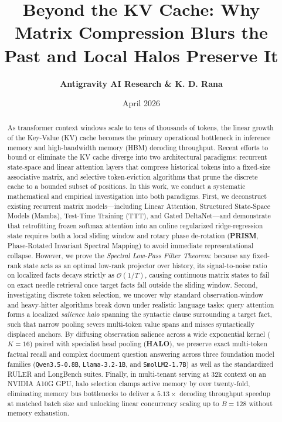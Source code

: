 \documentclass[11pt,a4paper]{article}
\title{\textbf{Beyond the KV Cache: Why Matrix Compression Blurs the Past and Local Halos Preserve It}}
\author{\textbf{Antigravity AI Research \& K. D. Rana}}
\date{April 2026}
\begin{document}
\maketitle

\begin{abstract}
\noindent As transformer context windows scale to tens of thousands of tokens, the linear growth of the Key-Value (KV) cache becomes the primary operational bottleneck in inference memory and high-bandwidth memory (HBM) decoding throughput. Recent efforts to bound or eliminate the KV cache diverge into two architectural paradigms: recurrent state-space and linear attention layers that compress historical tokens into a fixed-size associative matrix, and selective token-eviction algorithms that prune the discrete cache to a bounded subset of positions. In this work, we conduct a systematic mathematical and empirical investigation into both paradigms. First, we deconstruct existing recurrent matrix models---including Linear Attention, Structured State-Space Models (Mamba), Test-Time Training (TTT), and Gated DeltaNet---and demonstrate that retrofitting frozen softmax attention into an online regularized ridge-regression state requires both a local sliding window and rotary phase de-rotation (\textbf{PRISM}, Phase-Rotated Invariant Spectral Mapping) to avoid immediate representational collapse. However, we prove the \textit{Spectral Low-Pass Filter Theorem}: because any fixed-rank state acts as an optimal low-rank projector over history, its signal-to-noise ratio on localized facts decays strictly as $\mathcal{O}(1/T)$, causing continuous matrix states to fail on exact needle retrieval once target facts fall outside the sliding window. Second, investigating discrete token selection, we uncover why standard observation-window and heavy-hitter algorithms break down under realistic language tasks: query attention forms a localized \textit{salience halo} spanning the syntactic clause surrounding a target fact, such that narrow pooling severs multi-token value spans and misses syntactically displaced anchors. By diffusing observation salience across a wide exponential kernel ($K=16$) paired with specialist head pooling (\textbf{HALO}), we preserve exact multi-token factual recall and complex document question answering across three foundation model families (\texttt{Qwen3.5-0.8B}, \texttt{Llama-3.2-1B}, and \texttt{SmolLM2-1.7B}) as well as the standardized RULER and LongBench suites. Finally, in multi-tenant serving at $32\text{k}$ context on an NVIDIA A10G GPU, halo selection clamps active memory by over twenty-fold, eliminating memory bus bottlenecks to deliver a $5.13\times$ decoding throughput speedup at matched batch size and unlocking linear concurrency scaling up to $B=128$ without memory exhaustion.
\end{abstract}
\end{document}
